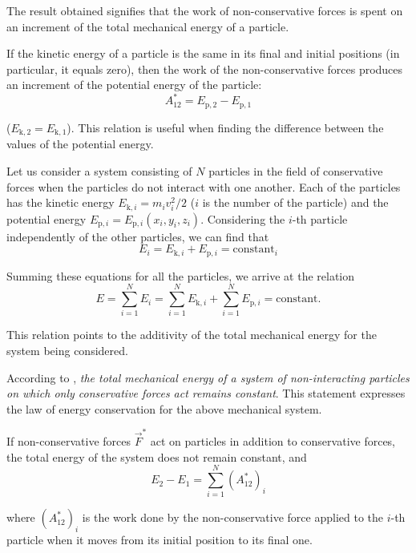 \noindent
The result obtained signifies that the work of non-conservative forces is spent on an increment of the total mechanical energy of a particle.

If the kinetic energy of a particle is the same in its final and initial  positions (in particular, it equals zero), then the work of the non-conservative forces produces an increment of the potential energy of the particle:
\begin{equation}\label{eq:3_38}
A_{12}^* = E_{\text{p},2} - E_{\text{p},1}
\end{equation}

\noindent
($E_{\text{k},2}=E_{\text{k},1}$). This relation is useful when finding the difference between the values of the potential energy.

Let us consider a system consisting of $N$ particles in the field of conservative forces when the particles do not interact with one another. Each of the particles has the kinetic energy $E_{\text{k},i}=m_iv_i^2/2$ ($i$ is the number of the particle) and the potential energy $E_{\text{p},i}=E_{\text{p},i}(x_i,y_i,z_i)$. Considering the $i$-th particle independently of the other particles, we can find that
\begin{equation*}
E_i = E_{\text{k},i} + E_{\text{p},i} = \text{constant}_i
\end{equation*}

\noindent
Summing these equations for all the particles, we arrive at the relation
\begin{equation}\label{eq:3_39}
E = \sum_{i=1}^{N}E_i = \sum_{i=1}^{N}E_{\text{k},i} + \sum_{i=1}^{N}E_{\text{p},i} = \text{constant}. 
\end{equation}

\noindent
This relation points to the additivity of the total mechanical energy for the system being considered.

According to , \textit{the total mechanical energy of a system of non-interacting particles on which only conservative forces act remains constant}. This statement expresses the law of energy conservation for the above mechanical system.

If non-conservative forces $\vec{F}^*$ act on particles in addition to conservative forces, the total energy of the system does not remain constant, and
\begin{equation}\label{eq:3_40}
E_2 - E_1 = \sum_{i=1}^{N}(A_{12}^*)_i 
\end{equation}

\noindent
where $(A_{12}^*)_i$ is the work done by the non-conservative force applied to the $i$-th particle when it moves from its initial position to its final one.

